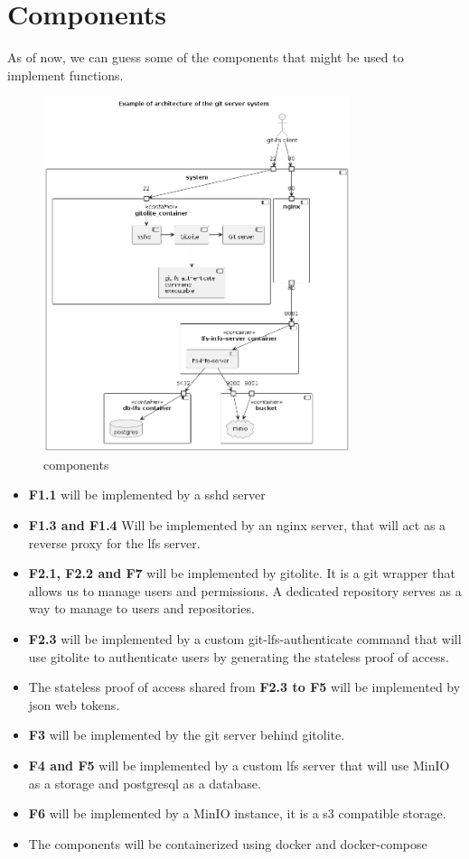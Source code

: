 \newpage
\section{Components}

As of now, we can guess some of the components that might be used to implement functions.

\begin{figure}[h]
    \centering
    \includegraphics[width=0.8\textwidth]{iteration_00/diagrams/components.png}
    \caption{components}
    \label{fig:components}
\end{figure}

\begin{itemize}
    \item \textbf{F1.1} will be implemented by a sshd server
    \item \textbf{F1.3 and F1.4} Will be implemented by an nginx server, that will act as a reverse proxy for the lfs server.
    \item \textbf{F2.1, F2.2 and F7} will be implemented by  gitolite. It is a git wrapper that allows us to manage users and permissions. A dedicated repository serves as a way to manage to users and repositories.
    \item \textbf{F2.3} will be implemented by a custom git-lfs-authenticate command that will use gitolite to authenticate users by generating the stateless proof of access.
    \item The stateless proof of access shared from \textbf{F2.3 to F5} will be implemented by json web tokens.
    \item \textbf{F3} will be implemented by the git server behind gitolite.
    \item \textbf{F4 and F5} will be implemented by  a custom lfs server that will use MinIO as a storage and postgresql as a database.
    \item \textbf{F6} will be implemented by a MinIO instance, it is a s3 compatible storage.
    \item The components will be containerized using docker and docker-compose
\end{itemize}

